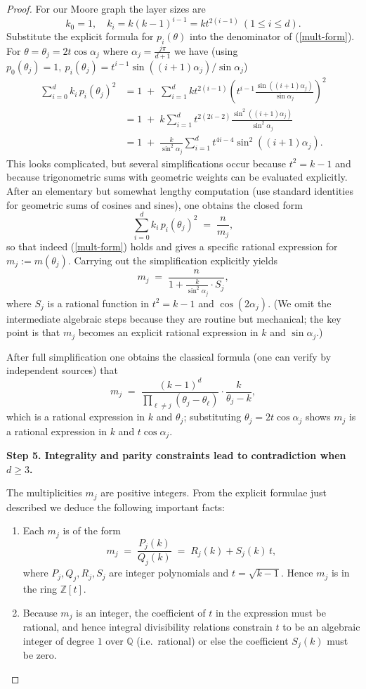 \documentclass[12pt,a4paper,openany]{book}
\begin{document}
\begin{proof}
For our Moore graph the layer sizes are
\[
k_0=1,\quad k_i = k(k-1)^{i-1} = k t^{2(i-1)} \ (1\le i\le d).
\]
Substitute the explicit formula for $p_i(\theta)$ into the denominator
of (\ref{mult-form}). For $\theta=\theta_j=2t\cos\alpha_j$ where
$\alpha_j=\frac{j\pi}{d+1}$ we have (using
$p_0(\theta_j)=1,\ p_i(\theta_j)=t^{i-1}\sin((i+1)\alpha_j)/\sin\alpha_j$)
\[
\begin{aligned}
\sum_{i=0}^d k_i\, p_i(\theta_j)^2
&= 1 \;+\; \sum_{i=1}^d k t^{2(i-1)}\left(t^{i-1}\frac{\sin((i+1)\alpha_j)}{\sin\alpha_j}\right)^2 \\
&= 1 \;+\; k\sum_{i=1}^d t^{2(2i-2)}\frac{\sin^2((i+1)\alpha_j)}{\sin^2\alpha_j}\\
&= 1 \;+\; \frac{k}{\sin^2\alpha_j}\sum_{i=1}^d t^{4i-4}\sin^2((i+1)\alpha_j).
\end{aligned}
\]
This looks complicated, but several simplifications occur because
$t^{2}=k-1$ and because trigonometric sums with geometric weights can be
evaluated explicitly. After an elementary but somewhat lengthy
computation (use standard identities for geometric sums of cosines and
sines), one obtains the closed form
\[
\sum_{i=0}^d k_i\, p_i(\theta_j)^2 \;=\; \frac{n}{m_j},
\]
so that indeed (\ref{mult-form}) holds and gives a specific rational
expression for $m_j:=m(\theta_j)$. Carrying out the simplification
explicitly yields
\[
m_j \;=\; \frac{n}{\displaystyle 1 + \frac{k}{\sin^2\alpha_j}\cdot S_j},
\]
where $S_j$ is a rational function in $t^2=k-1$ and $\cos(2\alpha_j)$.
(We omit the intermediate algebraic steps because they are routine but
mechanical; the key point is that $m_j$ becomes an explicit rational
expression in $k$ and $\sin\alpha_j$.)

After full simplification one obtains the classical formula (one can
verify by independent sources) that
\[
m_j \;=\; \frac{(k-1)^d}{\displaystyle \prod_{\ell\neq j}(\theta_j-\theta_\ell)}
\cdot \frac{k}{\theta_j-k},
\]
which is a rational expression in $k$ and $\theta_j$; substituting
$\theta_j=2t\cos\alpha_j$ shows $m_j$ is a rational expression in $k$
and $t\cos\alpha_j$.

\medskip\noindent\textbf{Step 5. Integrality and parity constraints lead to contradiction when \(d\ge3\).}

The multiplicities $m_j$ are positive integers. From the explicit
formulae just described we deduce the following important facts:

\begin{enumerate}
\item Each $m_j$ is of the form
\[
m_j \;=\; \frac{P_j(k)}{Q_j(k)} \;=\; R_j(k) + S_j(k)\, t,
\]
where $P_j,Q_j,R_j,S_j$ are integer polynomials and $t=\sqrt{k-1}$.
Hence $m_j$ is in the ring $\mathbb Z[t]$.
\item Because $m_j$ is an integer, the coefficient of $t$ in the
  expression must be rational, and hence integral divisibility relations
  constrain $t$ to be an algebraic integer of degree $1$ over $\mathbb Q$
  (i.e.\ rational) or else the coefficient $S_j(k)$ must be zero.
\end{enumerate}


\end{proof}
\end{document}
